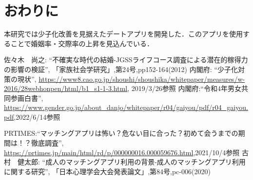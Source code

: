 \documentclass[twocolumn,10pt,a4j]{ltjsarticle}
\begin{document}
\section{おわりに}
本研究では少子化改善を見据えたデートアプリを開発した．このアプリを使用することで婚姻率・交際率の上昇を見込んでいる．

\begin{thebibliography}{99}
 佐々木　尚之: ``不確実な時代の結婚-JGSSライフコース調査による潜在的稼得力の影響の検証'', 「家族社会学研究」,第24号,pp152-164(2012)
 内閣府: ``少子化対策の現状'', \url{https://www8.cao.go.jp/shoushi/shoushika/whitepaper/measures/w-2016/28webhonpen/html/b1_s1-1-3.html}, 2019/3/26参照
内閣府:``令和4年男女共同参画白書'',
\url{https://www.gender.go.jp/about_danjo/whitepaper/r04/gaiyou/pdf/r04_gaiyou.pdf},2022/6/14参照


PRTIMES:``マッチングアプリは怖い？危ない目に合った？初めて会うまでの期間は！？徹底調査'',
\url{https://prtimes.jp/main/html/rd/p/000000016.000059676.html},2021/10/4参照
 古村　健太郎: ``成人のマッチングアプリ利用の背景-成人のマッチングアプリ利用に関する研究'', 「日本心理学会大会発表論文」,第84号,pc-006(2020)

\end{thebibliography}
\end{document}
